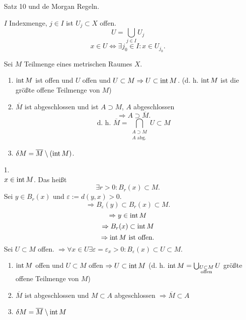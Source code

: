 \documentclass[../ana2.tex]{subfiles}
\begin{document}
\begin{bew}
    Satz 10 und de Morgan Regeln.
\end{bew}
\begin{bem}
    \( I \) Indexmenge, \( j \in I \) ist 
    \( U_j \subset X \) offen.
    \[ U = \bigcup_{j\in I} U_j \]
    \[ x \in U \Leftrightarrow \exists j_0 \in I: 
    x \in U_{j_0}. \]
\end{bem}
\begin{satz}
    Sei \( M \) Teilmenge eines metrischen 
    Raumes \( X \).
    \begin{enumerate}
        \item \( \operatorname{int} M \) ist offen und \( U \) offen 
        und \( U \subset M \Rightarrow U \subset \operatorname{int} M \).
        (d. h. \( \operatorname{int} M \) ist die größte offene Teilmenge 
        von \(M\))
        \item \( \overline{M} \) ist abgeschlossen und ist 
        \(A \supset M \), \( A \) abgeschlossen 
        \[ \Rightarrow A \supset \overline{M}. \]
        \[ \text{d. h. } \overline{M} 
        = \bigcap_{\substack{A \supset M\\A \text{ abg.}}} 
        U \subset M \]
        \item \( \delta M = \overline{M} \setminus (\operatorname{int} M) \).
    \end{enumerate}
\end{satz}
\begin{bew}
    1.\\
    \( x \in \operatorname{int} M \). Das heißt 
    \[ \exists r > 0: B_r(x) \subset M. \]
    Sei \( y \in B_r(x) \) und \( \varepsilon := d(y,x) > 0 \).
    \[ \Rightarrow B_\varepsilon(y) \subset B_r(x) 
    \subset M. \]
    \[ \Rightarrow y \in \operatorname{int} M \]
    \[ \Rightarrow B_r(x) \subset \operatorname{int} M \]
    \[ \Rightarrow \operatorname{int} M \text{ ist offen}. \]
    Sei \( U \subset M \) offen. 
    \( \Rightarrow \forall x \in U 
    \exists \varepsilon = \varepsilon_x > 0: 
    B_\varepsilon(x) \subset U \subset M \).
\end{bew}
\begin{satz*}\leavevmode
    \begin{enumerate}
        \item \( \operatorname{int} M \) offen und 
        \( U \subset M \) offen \( \Rightarrow U \subset \operatorname{int} M \)
        (d. h. \( \operatorname{int} M = \bigcup_{\substack{U \subset M \\\text{offen}}} U \) 
        größte offene Teilmenge von \(M\))
        \item \( \overline{M} \) ist abgeschlossen und 
        \( M \subset A \) abgeschlossen 
        \( \Rightarrow \overline{M} \subset A \)
        \item \( \delta M = \overline{M} \setminus \operatorname{int} M \)
    \end{enumerate}
\end{satz*}
\end{document}
